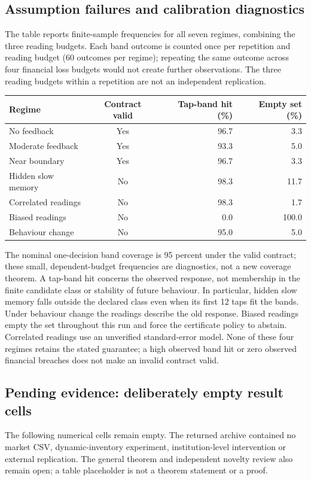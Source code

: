 \subsection*{Assumption failures and calibration diagnostics}
The table reports finite-sample frequencies for all seven regimes, combining
the three reading budgets. Each band outcome is counted once per repetition
and reading budget (60 outcomes per regime); repeating the same outcome across
four financial loss budgets would not create further observations. The three
reading budgets within a repetition are not an independent replication.
\begin{center}\small
\begin{tabular}{lcrr}
\toprule
Regime & Contract valid & Tap-band hit (\%) & Empty set (\%)\\
\midrule
No feedback & Yes & 96.7 & 3.3\\
Moderate feedback & Yes & 93.3 & 5.0\\
Near boundary & Yes & 96.7 & 3.3\\
Hidden slow memory & No & 98.3 & 11.7\\
Correlated readings & No & 98.3 & 1.7\\
Biased readings & No & 0.0 & 100.0\\
Behaviour change & No & 95.0 & 5.0\\
\bottomrule
\end{tabular}
\end{center}
The nominal one-decision band coverage is 95 percent under the valid contract;
these small, dependent-budget frequencies are diagnostics, not a new coverage
theorem. A tap-band hit concerns the observed response, not membership in the
finite candidate class or stability of future behaviour. In particular, hidden
slow memory falls outside the declared class even when its first 12 taps fit
the bands. Under behaviour change the readings describe the old response.
Biased readings empty the set throughout this run and force the certificate
policy to abstain. Correlated readings use an unverified standard-error model.
None of these four regimes retains the stated guarantee; a high observed band
hit or zero observed financial breaches does not make an invalid contract valid.

\subsection*{Pending evidence: deliberately empty result cells}
The following numerical cells remain empty. The returned archive contained no
market CSV, dynamic-inventory experiment, institution-level intervention or
external replication. The general theorem and independent novelty review also
remain open; a table placeholder is not a theorem statement or a proof.

